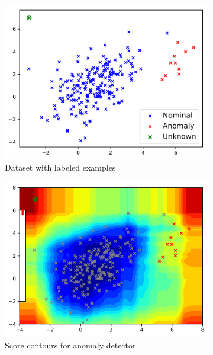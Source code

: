 \documentclass{article} %
\begin{document}
\begin{figure}
	\centering
	\captionsetup{labelformat=empty}
	\begin{subfigure}[b]{0.3\textwidth}
		\includegraphics[width=\textwidth, clip=true, trim=0mm 0mm 0mm 0mm]{avc_dataset_5}
		\caption{Dataset with labeled examples}
		\label{fig:dataset}
	\end{subfigure}
	\begin{subfigure}[b]{0.3\textwidth}
		\includegraphics[width=\textwidth, clip=true, trim=0mm 0mm 0mm 0mm]{avc_dataset_5_anomaly}
		\caption{Score contours for anomaly detector}
		\label{fig:aad}
	\end{subfigure}
    \begin{subfigure}[b]{0.3\textwidth}

\end{subfigure}
\end{figure}
\end{document}
